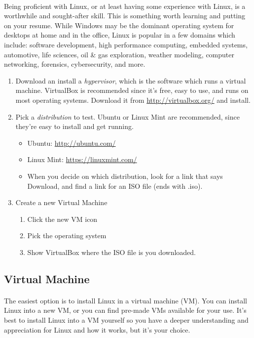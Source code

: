 \documentclass[letter,11pt]{article}
\begin{document}
\paragraph{}Being proficient with Linux, or at least having some experience with Linux, is a worthwhile and sought-after skill. This is something worth learning and putting on your resume. While Windows may be the dominant operating system for desktops at home and in the office, Linux is popular in a few domains which include: software development, high performance computing, embedded systems, automotive, life sciences, oil \& gas exploration, weather modeling, computer networking, forensics, cybersecurity, and more.

\begin{enumerate}
    \item Download an install a \textit{hypervisor}, which is the software which runs a virtual machine. VirtualBox is recommended since it's free, easy to use, and runs on most operating systems. Download it from \url{http://virtualbox.org/} and install.
    \item Pick a \textit{distribution} to test. Ubuntu or Linux Mint are recommended, since they're easy to install and get running.
    \begin{itemize}
        \item Ubuntu: \url{http://ubuntu.com/}
        \item Linux Mint: \url{https://linuxmint.com/}
        \item When you decide on which distribution, look for a link that says Download, and find a link for an ISO file (ends with .iso). 
    \end{itemize}
    \item Create a new Virtual Machine
    \begin{enumerate}
        \item Click the new VM icon
        \item Pick the operating system
        \item Show VirtualBox where the ISO file is you downloaded.
    \end{enumerate}
\end{enumerate}

\subsection{Virtual Machine}
\paragraph{}The easiest option is to install Linux in a virtual machine (VM). You can install Linux into a new VM, or you can find pre-made VMs available for your use. It's best to install Linux into a VM yourself so you have a deeper understanding and appreciation for Linux and how it works, but it's your choice.
\end{document}
